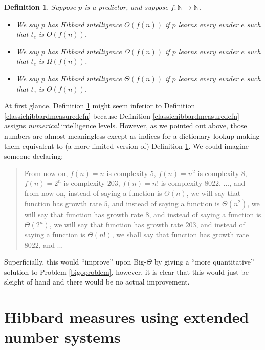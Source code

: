\documentclass{article}
\newtheorem{definition}[theorem]{Definition}
\begin{document}
\begin{definition}
\label{bigointelligencedefn}
    Suppose $p$ is a predictor, and suppose $f:\mathbb N\to\mathbb N$.
    \begin{itemize}
        \item
        We say \emph{$p$ has Hibbard intelligence $O(f(n))$} if
        $p$ learns every evader $e$ such that $t_e$ is $O(f(n))$.
        \item
        We say \emph{$p$ has Hibbard intelligence $\Omega(f(n))$} if
        $p$ learns every evader $e$ such that $t_e$ is $\Omega(f(n))$.
        \item
        We say \emph{$p$ has Hibbard intelligence $\Theta(f(n))$} if
        $p$ learns every evader $e$ such that $t_e$ is $\Theta(f(n))$.
    \end{itemize}
\end{definition}

At first glance, Definition \ref{bigointelligencedefn} might seem inferior to
Definition \ref{classichibbardmeasuredefn} because
Definition \ref{classichibbardmeasuredefn} assigns \emph{numerical} intelligence levels.
However, as we pointed out above, those numbers are almost meaningless except as indices for
a dictionary-lookup making them equivalent to (a more limited version of)
Definition \ref{bigointelligencedefn}. We could imagine someone declaring:
\begin{quote}
    From now on, $f(n)=n$ is complexity $5$, $f(n)=n^2$ is complexity $8$,
    $f(n)=2^n$ is complexity $203$,
    $f(n)=n!$ is complexity $8022$, ..., and from now on, instead of saying a
    function is $\Theta(n)$, we will say that function has growth rate $5$,
    and instead of saying a function is $\Theta(n^2)$, we will say that function
    has growth rate $8$, and instead of saying a function is $\Theta(2^n)$, we will
    say that function has growth rate $203$, and instead of saying a function is
    $\Theta(n!)$, we shall say that function has growth rate $8022$, and ...
\end{quote}
Superficially, this would ``improve'' upon Big-$\Theta$ by giving a ``more quantitative''
solution to Problem \ref{bigoproblem}, however, it is clear
that this would just be sleight of hand and there would be no actual improvement.

\section{Hibbard measures using extended number systems}
\label{exoticsection}
\end{document}
